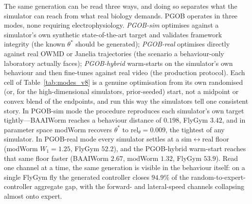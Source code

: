 \documentclass[11pt]{article}
\begin{document}
The same generation can be read three ways, and doing so separates what the simulator can reach from what real biology demands. PGOB operates in three modes, none requiring electrophysiology. \emph{PGOB-sim} optimises against a simulator's own synthetic state-of-the-art target and validates framework integrity (the known $\theta^{*}$ should be generated); \emph{PGOB-real} optimises directly against real OWMD or Janelia trajectories (the scenario a behaviour-only laboratory actually faces); \emph{PGOB-hybrid} warm-starts on the simulator's own behaviour and then fine-tunes against real video (the production protocol). Each cell of Table~\ref{tab:modes_v8} is a genuine optimisation from its own randomised (or, for the high-dimensional simulators, prior-seeded) start, not a midpoint or convex blend of the endpoints, and run this way the simulators tell one consistent story. In PGOB-sim mode the procedure reproduces each simulator's own target tightly---BAAIWorm reaches a behaviour distance of $0.198$, FlyGym $3.42$, and in parameter space modWorm recovers $\theta^{*}$ to $\mathrm{rel}_\theta{=}0.009$, the tightest of any simulator. In PGOB-real mode every simulator settles at a sim$\leftrightarrow$real floor (modWorm $W_1{=}1.25$, FlyGym $52.2$), and the PGOB-hybrid warm-start reaches that same floor faster (BAAIWorm $2.67$, modWorm $1.32$, FlyGym $53.9$). Read one channel at a time, the same generation is visible in the behaviour itself: on a single FlyGym fly the generated controller closes $94.9\%$ of the random-to-expert-controller aggregate gap, with the forward- and lateral-speed channels collapsing almost onto expert.
\end{document}
